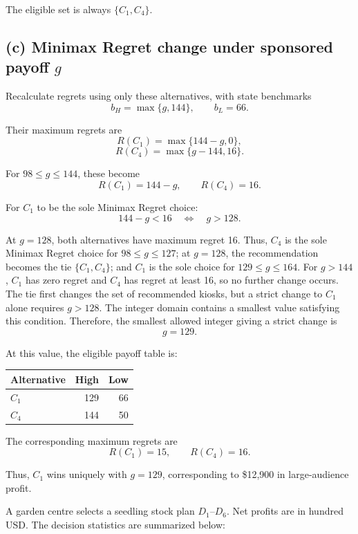 The eligible set is always $\{C_1,C_4\}$.
\secInicio[sec:q2]

\label{sol:q2c}
\subsection*{(c) Minimax Regret change under sponsored payoff $g$ }

Recalculate regrets using only these alternatives,
with state benchmarks
\[
b_H=\max\{g,144\},\qquad b_L=66.
\]

Their maximum regrets are
\[
R(C_1)=\max\{144-g,0\},
\]
\[
R(C_4)=\max\{g-144,16\}.
\]

For $98\le g\le144$, these become
\[
R(C_1)=144-g,\qquad R(C_4)=16.
\]

For $C_1$ to be the sole Minimax Regret choice:
\[
144-g<16
\quad\Longleftrightarrow\quad g>128.
\]

At $g=128$, both alternatives have maximum regret 16.
Thus, $C_4$ is the sole Minimax Regret choice for $98\le g\le127$;
at $g=128$, the recommendation becomes the tie $\{C_1,C_4\}$;
and $C_1$ is the sole choice for $129\le g\le164$.
For $g>144$, $C_1$ has zero regret and $C_4$ has regret at least 16,
so no further change occurs.
The tie first changes the set of recommended kiosks, but a strict
change to $C_1$ alone requires $g>128$.
The integer domain contains a smallest value satisfying this condition.
Therefore, the smallest allowed integer giving a strict change is
\[
\boxed{g=129}.
\]

At this value, the eligible payoff table is:

\begin{center}\small\setlength{\tabcolsep}{4pt}
\begin{tabular}{lrr}\toprule
Alternative & High & Low\\ \midrule
$C_1$ & 129 & 66\\
$C_4$ & 144 & 50\\
\bottomrule
\end{tabular}
\end{center}

The corresponding maximum regrets are
\[
R(C_1)=15,\qquad R(C_4)=16.
\]

Thus, $C_1$ wins uniquely with $g=129$,
corresponding to \$12,900 in large-audience profit.
\secInicio[sec:q2]



A garden centre selects a seedling stock plan $D_1$--$D_6$. Net profits are in hundred USD. The decision statistics are summarized below:

